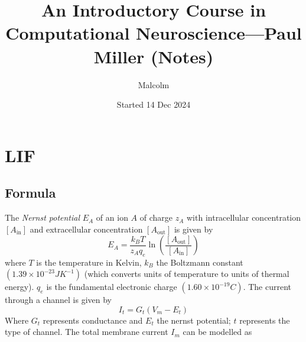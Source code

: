 \documentclass{report}
\title{An Introductory Course in Computational Neuroscience---Paul Miller (Notes)}
\date{Started 14 Dec 2024}
\author{Malcolm}
\begin{document}
\maketitle
\tableofcontents
\newpage

\section{LIF}
\subsection{Formula}
The \textit{Nernst potential} $E_A$ of an ion $A$ of charge $z_A$ with intracellular concentration $[A_{\text{in}}]$ and extracellular concentration $[A_{\text{out}}]$ is given by
\begin{equation*}
E_A=\frac{k_BT}{z_Aq_e}\ln\left(\frac{[A_{\text{out}}]}{[A_{\text{in}}]}\right)
\end{equation*}
where $T$ is the temperature in Kelvin, $k_B$ the Boltzmann constant $(1.39\times10^{-23}JK^{-1})$ (which converts units of temperature to units of thermal energy). $q_e$ is the fundamental electronic charge
$(1.60\times10^{-19}C)$.
The current through a channel is given by
\begin{equation*}
I_t=G_t(V_m-E_t)
\end{equation*}
Where $G_t$ represents conductance and $E_t$ the nernst potential; $t$ represents the type of channel. The total membrane current $I_m$ can be modelled as
\end{document}
